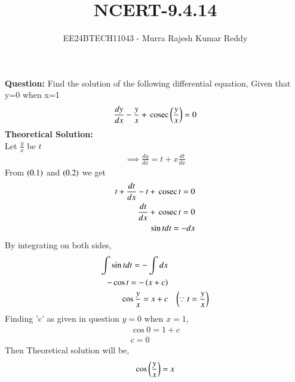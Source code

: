 \documentclass[journal]{IEEEtran}
\begin{document}

\vspace{3cm}

\title{NCERT-9.4.14}
\author{EE24BTECH11043 - Murra Rajesh Kumar Reddy}

{\let\newpage\relax\maketitle}

\renewcommand{\thefigure}{\theenumi}
\renewcommand{\thetable}{\theenumi}
\setlength{\intextsep}{10pt} %


\renewcommand{\thetable}{\theenumi}
\textbf{Question:}
 Find the solution of the following differential equation, Given that y=0 when x=1
 \begin{align}
 \frac{dy}{dx} - \frac{y}{x} + \,\text{cosec}\,{\left(\frac{y}{x}\right)} = 0
 \end{align}
 \textbf{Theoretical Solution:} \\
	 Let $\frac{y}{x}$ be $t$ \\
	 \begin{align}
		\implies \frac{dy}{dx} = t+x\frac{dt}{dx}
	 \end{align}
	 From $\left(0.1\right)$ and $\left(0.2\right)$ we get
	 \begin{align}
		 t+\frac{dt}{dx}-t+\,\text{cosec}\,{t} = 0 \\
		 \frac{dt}{dx}+\,\text{cosec}\,{t}=0 \\
		 \sin{t}dt=-dx \\
	 \end{align}
	 By integrating on both sides,
	 \begin{align}
		 \int{\sin{t}}dt=-\int dx\\
		 -\cos{t}=-\left(x+c\right)\\
		 \cos{\frac{y}{x}}=x+c  && \left(\because t =\frac{y}{x} \right)
	 \end{align}
	 Finding 'c' as given in question $y=0$ when $x=1$,
	 \begin{align}
		 \cos{0}=1+c \\
		 c=0
	 \end{align}
	 Then Theoretical solution will be,
	 \begin{align}
		 \cos{\ensuremath{\left(\frac{y}{x}\right)}}=x
	 \end{align}
\end{document}
